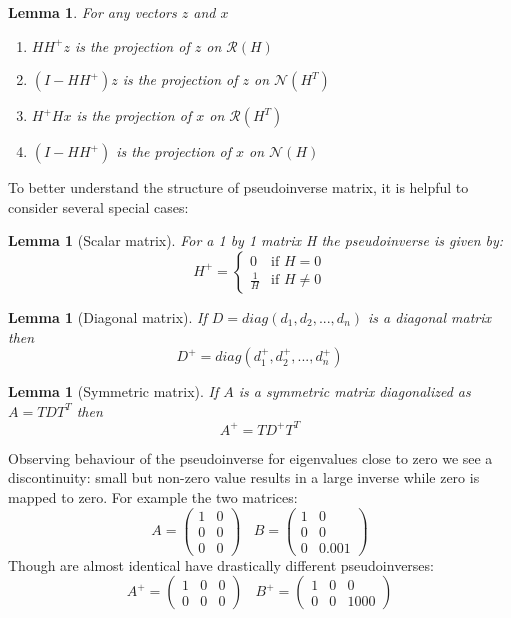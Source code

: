 \documentclass[a4paper]{article}
\theoremstyle{break}
\newtheorem{lemma}[theorem]{Lemma}
\newcommand{\Nu}{\mathcal{N}}
\newcommand{\Ra}{\mathcal{R}}
\begin{document}
\begin{lemma}
    For any vectors $z$ and $x$
    \begin{enumerate}
        \item $ H H^+ z $ is the projection of $z$ on $\Ra(H)$
        \item $ (I - H H^+) z $ is the projection of $z$ on $\Nu(H^T)$
        \item $ H^+ H x$ is the projection of $x$ on $ \Ra(H^T)$
        \item $ (I - H H^+) $ is the projection of $x$ on $ \Nu(H)$
    \end{enumerate}
\end{lemma}

To better understand the structure of pseudoinverse matrix, it is helpful to consider several special cases:
\begin{lemma}[Scalar matrix]
    For a 1 by 1 matrix H the pseudoinverse is given by:
    $$ H^+ = \begin{cases}
        0~~~           \text{ if } H = 0\\
        \frac{1}{H}~~ \text{ if } H \neq 0
    \end{cases}$$
\end{lemma}
\begin{lemma}[Diagonal matrix]
    If $D = diag(d_1, d_2, ..., d_n)$ is a diagonal matrix then
    $$ D^+ = diag(d_1^+, d_2^+, ..., d_n^+) $$
\end{lemma}
\begin{lemma}[Symmetric matrix]
    If $A$ is a symmetric matrix diagonalized as $A = T D T^T $ then
    $$ A^+ = T D^+ T^T$$
\end{lemma}

Observing behaviour of the pseudoinverse for eigenvalues close to zero we see a discontinuity: small but non-zero value results in a large inverse while zero is mapped to zero. For example the two matrices:
$$ A = \left( \begin{matrix}
1 & 0 \\
0 & 0 \\
0 & 0
\end{matrix} \right) ~~~~
B = \left( \begin{matrix}
1 & 0 \\
0 & 0 \\
0 & 0.001
\end{matrix} \right)$$
Though are almost identical have drastically different pseudoinverses:
$$ A^+ = \left( \begin{matrix}
1 & 0 & 0\\
0 & 0 & 0
\end{matrix} \right) ~~~~
B^+ = \left( \begin{matrix}
1 & 0 & 0\\
0 & 0 & 1000
\end{matrix} \right)$$
\end{document}
